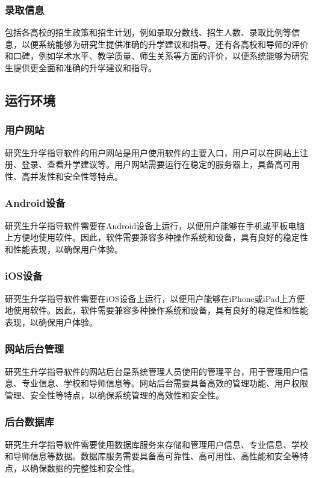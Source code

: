 \documentclass[UTF8]{ctexart}
\newcommand{\m}[1]{\textcolor{modify}{#1}}
\begin{document}
    \subsubsection{录取信息}
    包括各高校的招生政策和招生计划，例如录取分数线、招生人数、录取比例等信息，以便系统能够为研究生提供准确的升学建议和指导。还有各高校和导师的评价和口碑，例如学术水平、教学质量、师生关系等方面的评价，以便系统能够为研究生提供更全面和准确的升学建议和指导。

    \subsection{运行环境}
    \m{
    \subsubsection{用户网站}
    研究生升学指导软件的用户网站是用户使用软件的主要入口，用户可以在网站上注册、登录、查看升学建议等。用户网站需要运行在稳定的服务器上，具备高可用性、高并发性和安全性等特点。
    \subsubsection{Android设备}
    研究生升学指导软件需要在Android设备上运行，以便用户能够在手机或平板电脑上方便地使用软件。因此，软件需要兼容多种操作系统和设备，具有良好的稳定性和性能表现，以确保用户体验。
    \subsubsection{iOS设备}
    研究生升学指导软件需要在iOS设备上运行，以便用户能够在iPhone或iPad上方便地使用软件。因此，软件需要兼容多种操作系统和设备，具有良好的稳定性和性能表现，以确保用户体验。
    \subsubsection{网站后台管理}
    研究生升学指导软件的网站后台是系统管理人员使用的管理平台，用于管理用户信息、专业信息、学校和导师信息等。网站后台需要具备高效的管理功能、用户权限管理、安全性等特点，以确保系统管理的高效性和安全性。
    \subsubsection{后台数据库}
    研究生升学指导软件需要使用数据库服务来存储和管理用户信息、专业信息、学校和导师信息等数据。数据库服务需要具备高可靠性、高可用性、高性能和安全等特点，以确保数据的完整性和安全性。
    }
    
\end{document}
